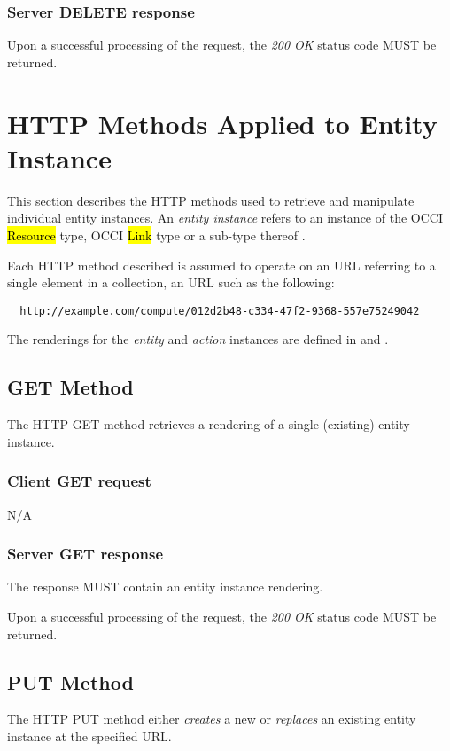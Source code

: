 \documentclass[10pt,a4paper]{article}
\begin{document}
\subsubsection*{Server DELETE response}
Upon a successful processing of the request, the \emph{200 OK} status code MUST be returned.

\section{HTTP Methods Applied to Entity Instance}



This section describes the HTTP methods used to retrieve and manipulate
individual entity instances. An {\em entity instance} refers to an instance
of the OCCI \hl{Resource} type, OCCI \hl{Link} type or a sub-type thereof
\cite{occi:core}.

Each HTTP method described is assumed to operate on an URL referring to
a single element in a collection, an URL such as the following:
\begin{verbatim}
  http://example.com/compute/012d2b48-c334-47f2-9368-557e75249042
\end{verbatim}

The renderings for the {\em entity} and {\em action} instances are defined in \cite{occi:text} and \cite{occi:json}.

\subsection{GET Method}
The HTTP GET method retrieves a rendering of a single (existing) entity instance.

\subsubsection*{Client GET request}
N/A

\subsubsection*{Server GET response}
The response MUST contain an entity instance rendering.

Upon a successful processing of the request, the \emph{200 OK} status code MUST be returned.

\subsection{PUT Method}
The HTTP PUT method either {\em creates} a new or {\em replaces} an existing
entity instance at the specified URL.
\end{document}
